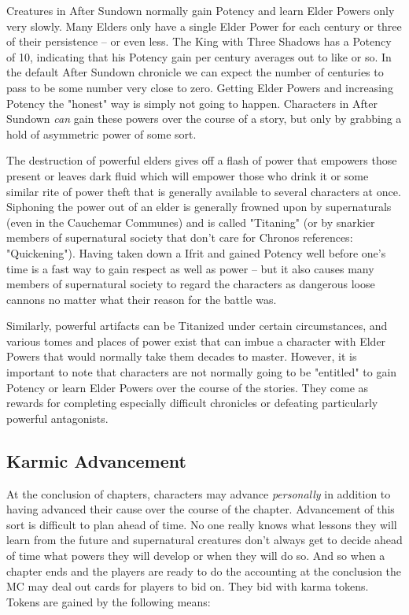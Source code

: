 Creatures in After Sundown normally gain Potency and learn Elder Powers only very slowly. Many Elders only have a single Elder Power for each century or three of their persistence -- or even less. The King with Three Shadows has a Potency of 10, indicating that his Potency gain per century averages out to like  or so. In the default After Sundown chronicle we can expect the number of centuries to pass to be some number very close to zero. Getting Elder Powers and increasing Potency the "honest" way is simply not going to happen. Characters in After Sundown \textit{can} gain these powers over the course of a story, but only by grabbing a hold of asymmetric power of some sort. 

The destruction of powerful elders gives off a flash of power that empowers those present or leaves dark fluid which will empower those who drink it or some similar rite of power theft that is generally available to several characters at once. Siphoning the power out of an elder is generally frowned upon by supernaturals (even in the Cauchemar Communes) and is called "Titaning" (or by snarkier members of supernatural society that don't care for Chronos references: "Quickening"). Having taken down a Ifrit and gained Potency well before one's time is a fast way to gain respect as well as power -- but it also causes many members of supernatural society to regard the characters as dangerous loose cannons no matter what their reason for the battle was.

Similarly, powerful artifacts can be Titanized under certain circumstances, and various tomes and places of power exist that can imbue a character with Elder Powers that would normally take them decades to master. However, it is important to note that characters are not normally going to be "entitled" to gain Potency or learn Elder Powers over the course of the stories. They come as rewards for completing especially difficult chronicles or defeating particularly powerful antagonists.

\subsection{Karmic Advancement}

At the conclusion of chapters, characters may advance \textit{personally} in addition to having advanced their cause over the course of the chapter. Advancement of this sort is difficult to plan ahead of time. No one really knows what lessons they will learn from the future and supernatural creatures don't always get to decide ahead of time what powers they will develop or when they will do so. And so when a chapter ends and the players are ready to do the accounting at the conclusion the MC may deal out cards for players to bid on. They bid with karma tokens. Tokens are gained by the following means:

